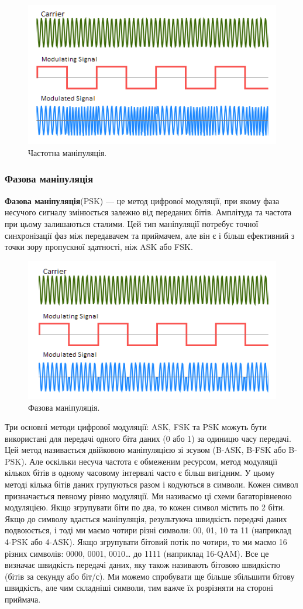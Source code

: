 \documentclass{article}
\begin{document}
\begin{figure}[h!]
	\centering
	\includegraphics[width=0.6\linewidth]{images/fsk.png}
	\caption{\label{fig:fsk}Частотна маніпуляція.}
\end{figure}

\subsubsection{Фазова маніпуляція}
\textbf{Фазова маніпуляція}(PSK) --- це метод цифрової модуляції, при якому фаза несучого сигналу змінюється залежно від переданих бітів. Амплітуда та частота при цьому залишаються сталими. Цей тип маніпуляції потребує точної синхронізації фаз між передавачем та приймачем, але він є і більш ефективний з точки зору пропускної здатності, ніж ASK або FSK.

\begin{figure}[h!]
	\centering
	\includegraphics[width=0.6\linewidth]{images/psk.png}
	\caption{\label{fig:psk}Фазова маніпуляція.}
\end{figure}

Три основні методи цифрової модуляції: ASK, FSK та PSK можуть бути використані для передачі одного біта даних (0 або 1) за одиницю часу передачі. Цей метод називається двійковою маніпуляцією зі зсувом (B-ASK, B-FSK або B-PSK). Але оскільки несуча частота є обмеженим ресурсом, метод модуляції кількох бітів в одному часовому інтервалі часто є більш вигідним. У цьому методі кілька бітів даних групуються разом і кодуються в символи. Кожен символ призначається певному рівню модуляції. Ми називаємо ці схеми багаторівневою модуляцією. Якщо згрупувати біти по два, то кожен символ містить по 2 біти. Якщо до символу вдається маніпуляція, результуюча швидкість передачі даних подвоюється, і тоді ми маємо чотири різні символи: 00, 01, 10 та 11 (наприклад 4-PSK або 4-ASK). Якщо згрупувати бітовий потік по чотири, то ми маємо 16 різних символів: 0000, 0001, 0010… до 1111 (наприклад 16-QAM). Все це визначає швидкість передачі даних, яку також називають бітовою швидкістю (бітів за секунду або біт/с). Ми можемо спробувати ще більше збільшити бітову швидкість, але чим складніші символи, тим важче їх розрізняти на стороні приймача.
\end{document}
